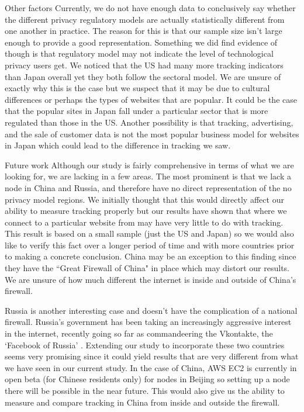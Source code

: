 \documentclass[journal]{IEEEtran}
\begin{document}
Other factors 
Currently, we do not have enough data to conclusively say whether the different privacy regulatory models are actually statistically different from one another in practice. The reason for this is that our sample size isn't large enough to provide a good representation. Something we did find evidence of though is that regulatory model may not indicate the level of technological privacy users get. We noticed that the US had many more tracking indicators than Japan overall yet they both follow the sectoral model. We are unsure of exactly why this is the case but we suspect that it may be due to cultural differences or perhaps the types of websites that are popular. It could be the case that the popular sites in Japan fall under a particular sector that is more regulated than those in the US. Another possibility is that tracking, advertising, and the sale of customer data is not the most popular business model for websites in Japan which could lead to the difference in tracking we saw.

Future work
Although our study is fairly comprehensive in terms of what we are looking for, we are lacking in a few areas. The most prominent is that we lack a node in China and Russia, and therefore have no direct representation of the no privacy model regions. We initially thought that this would directly affect our ability to measure tracking properly but our results have shown that where we connect to a particular website from may have very little to do with tracking. This result is based on a small sample (just the US and Japan) so we would also like to verify this fact over a longer period of time and with more countries prior to making a concrete conclusion. China may be an exception to this finding since they have the ``Great Firewall of China" in place which may distort our results. We are unsure of how much different the internet is inside and outside of China's firewall. 

Russia is another interesting case and doesn't have the complication of a national firewall. Russia's government has been taking an increasingly aggressive interest in the internet, recently going so far as commandeering the Vkontakte, the `Facebook of Russia' \cite{toor}. Extending our study to incorporate these two countries seems very promising since it could yield results that are very different from what we have seen in our current study. In the case of China, AWS EC2 is currently in open beta (for Chinese residents only) for nodes in Beijing so setting up a node there will be possible in the near future. This would also give us the ability to measure and compare tracking in China from inside and outside the firewall.
\end{document}
